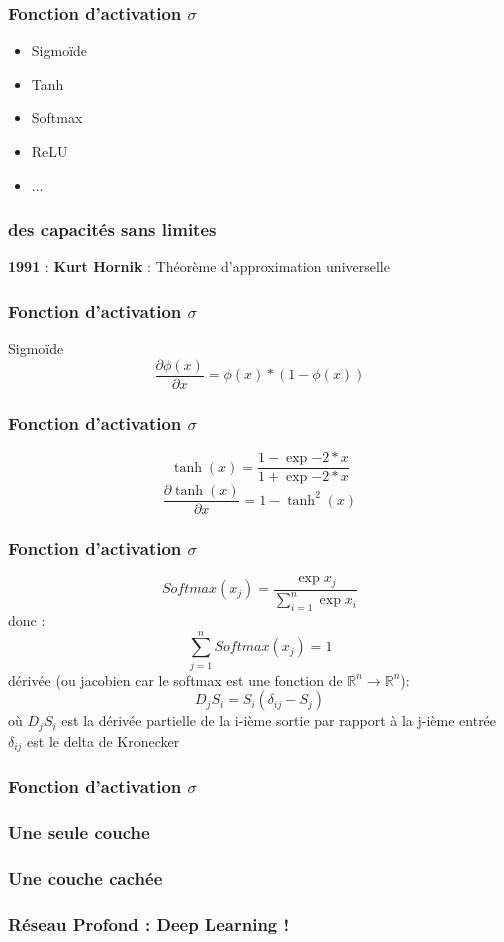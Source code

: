 \begin{frame}
  \frametitle{Fonction d'activation $\sigma$}
  \begin{itemize}
  \item Sigmoïde
  \item Tanh
  \item Softmax
  \item ReLU
  \item ...
  \end{itemize}
\end{frame}

\begin{frame}
  \frametitle{des capacités sans limites}
  \textbf{1991} : \textbf{Kurt Hornik} : Théorème d'approximation universelle
\end{frame}

\begin{frame}
  \frametitle{Fonction d'activation $\sigma$}
  Sigmoïde
  \[
  \frac{\partial{\phi(x)}}{\partial{x}}=\phi(x)*(1-\phi(x))
  \]
\end{frame}

\begin{frame}
  \frametitle{Fonction d'activation $\sigma$}
  \[
  \tanh(x)=\frac{1-\exp{-2*x}}{1+\exp{-2*x}}
  \]
  \[
  \frac{\partial{\tanh(x)}}{\partial{x}}=1-\tanh^2(x)
  \]
\end{frame}

\begin{frame}
  \frametitle{Fonction d'activation $\sigma$}
  \[
  \mathit{Softmax}(x_j)=\frac{\exp{x_j}}{\sum_{i=1}^n{\exp{x_i}}}
  \]
  donc :
  \[
  \sum_{j=1}^n{\mathit{Softmax}(x_j)}=1
  \]
  dérivée (ou jacobien car le softmax est une fonction de $\mathbb{R}^n\rightarrow\mathbb{R}^n$):
  \[
  D_jS_i = S_i(\delta_{ij}-S_j)
  \]
  où
  $D_jS_i$ est la dérivée partielle de la i-ième sortie par rapport à la j-ième entrée
  \newline
  $\delta_{ij}$ est le delta de Kronecker
\end{frame}

\begin{frame}
  \frametitle{Fonction d'activation $\sigma$}
  \begin{minipage}[c]{0.39\linewidth}
  \end{minipage}\hfill
  \begin{minipage}[c]{0.59\linewidth}
  \end{minipage}\hfill
\end{frame}

\begin{frame}
  \frametitle{Une seule couche}
\end{frame}

\begin{frame}
  \frametitle{Une couche cachée}
\end{frame}

\begin{frame}
  \frametitle{Réseau Profond : Deep Learning !}
\end{frame}
